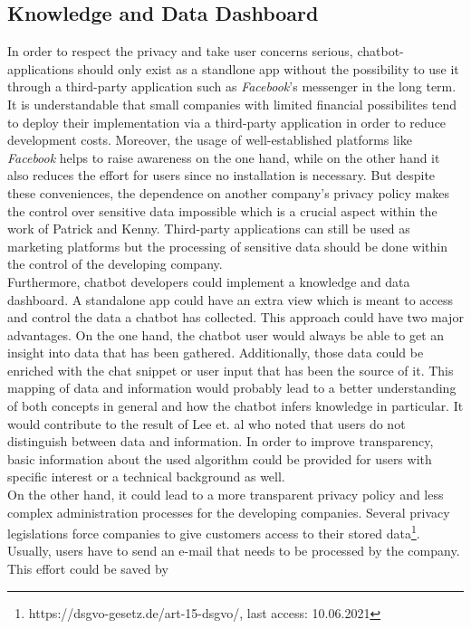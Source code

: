\documentclass[sigconf, nonacm]{acmart}
\begin{document}
\subsection{Knowledge and Data Dashboard}
\label{sec:four_one}
In order to respect the privacy and take user concerns serious, chatbot-applications should only exist as a standlone app without the possibility to use it through a third-party application such as \emph{Facebook}'s messenger in the long term. It is understandable that small companies with limited
financial possibilites tend to deploy their implementation via a third-party application in order to reduce development costs. Moreover, the usage of well-established platforms like \emph{Facebook} helps to raise awareness on the one hand, while on the other hand it also reduces the effort for users since no installation is necessary. 
But despite these conveniences, the dependence on another company's privacy policy makes the control over sensitive data impossible which is a crucial aspect within the 
work of Patrick and Kenny\cite{Patrick2003}. Third-party applications can still be used as marketing platforms but the processing of sensitive data should be done within the control of the developing company.
\\
Furthermore, chatbot developers could implement a knowledge and data dashboard. A standalone app could have an extra view which is meant to access and control the data a chatbot has collected.
This approach could have two major advantages. On the one hand, the chatbot user would always be able to get an insight into data that has been gathered. Additionally, those data could be enriched with the chat snippet or user input that has been the source of it. 
This mapping of data and information would probably lead to a better understanding of both concepts in general and how the chatbot infers knowledge in particular. It would contribute to the result of Lee et. al \cite{Lee2011} who noted that users do not distinguish between data and information.
In order to improve transparency, basic information about the used algorithm could be provided for users with specific interest or a technical background as well.
\\
On the other hand, it could lead to a more transparent privacy policy and less complex administration processes for the developing companies. Several privacy legislations force companies to give customers access to their stored data\footnote{https://dsgvo-gesetz.de/art-15-dsgvo/, last access: 10.06.2021}. Usually, users have to send an e-mail that needs to be processed by the company. This effort could be saved by
\end{document}
